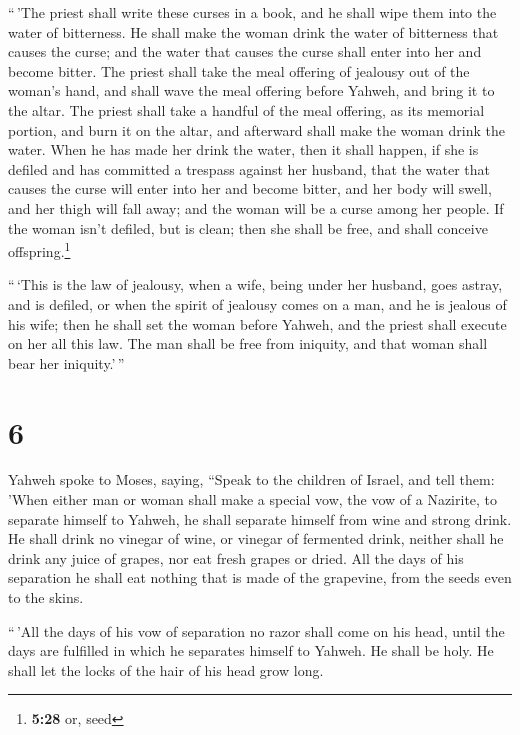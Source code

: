  ``\,'The priest shall write these curses in a book, and
he shall wipe them into the water of bitterness.  He
shall make the woman drink the water of bitterness that causes the
curse; and the water that causes the curse shall enter into her and
become bitter.  The priest shall take the meal offering
of jealousy out of the woman's hand, and shall wave the meal offering
before Yahweh, and bring it to the altar.  The priest
shall take a handful of the meal offering, as its memorial portion, and
burn it on the altar, and afterward shall make the woman drink the
water.  When he has made her drink the water, then it
shall happen, if she is defiled and has committed a trespass against her
husband, that the water that causes the curse will enter into her and
become bitter, and her body will swell, and her thigh will fall away;
and the woman will be a curse among her people.  If the
woman isn't defiled, but is clean; then she shall be free, and shall
conceive offspring.\footnote{\textbf{5:28} or, seed}

 ``\,`This is the law of jealousy, when a wife, being
under her husband, goes astray, and is defiled,  or when
the spirit of jealousy comes on a man, and he is jealous of his wife;
then he shall set the woman before Yahweh, and the priest shall execute
on her all this law.  The man shall be free from
iniquity, and that woman shall bear her iniquity.'\,''

\hypertarget{section-5}{%
\section{6}\label{section-5}}

 Yahweh spoke to Moses, saying,  ``Speak to
the children of Israel, and tell them: 'When either man or woman shall
make a special vow, the vow of a Nazirite, to separate himself to
Yahweh,  he shall separate himself from wine and strong
drink. He shall drink no vinegar of wine, or vinegar of fermented drink,
neither shall he drink any juice of grapes, nor eat fresh grapes or
dried.  All the days of his separation he shall eat
nothing that is made of the grapevine, from the seeds even to the skins.

 ``\,'All the days of his vow of separation no razor shall
come on his head, until the days are fulfilled in which he separates
himself to Yahweh. He shall be holy. He shall let the locks of the hair
of his head grow long.

